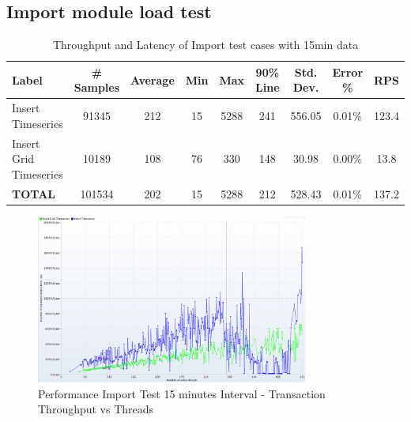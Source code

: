 \subsection{Import module load test}
\label{subse:obs_test_plan_import_15min}
\begin{table}[ht]
\footnotesize
\begin{tabulary}{\linewidth}{|L|C|C|C|C|C|C|C|C|}
\hline
Label & \# Samples & Average & Min & Max & 90\% Line & Std. Dev. & Error \% & RPS \\ \hline
Insert Timeseries & 91345 & 212 & 15 & 5288 & 241 & 556.05 & 0.01\% & 123.4 \\ \hline
Insert Grid Timeseries & 10189 & 108 & 76 & 330 & 148 & 30.98 & 0.00\% & 13.8 \\ \hline
\textbf{TOTAL} & 101534 & 202 & 15 & 5288 & 212 & 528.43 & 0.01\% & 137.2 \\ \hline
\end{tabulary}
\caption{Throughput and Latency of Import test cases with 15min data}
\label{tab:obs_import_15_min_summary}
\end{table}


\begin{figure}[htp]
    \centering
    \includegraphics[width=0.8\textwidth]{results/obs/import/obs_import_15m_transaction_throughtput_vs_threads.png}
    \caption{Performance Import Test 15 minutes Interval - Transaction Throughput vs Threads}
    \label{fi:test_obs_import_15m_throughtput}
\end{figure}

